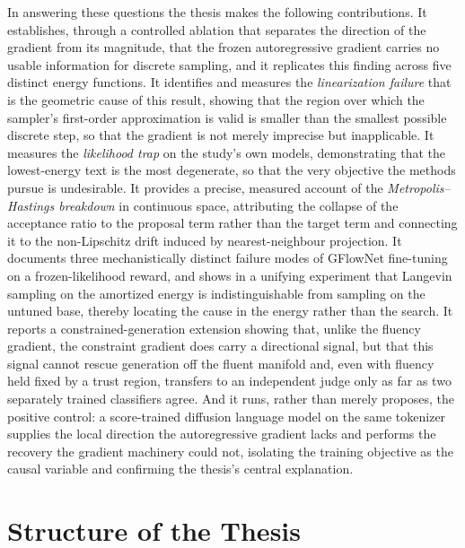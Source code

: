 In answering these questions the thesis makes the following contributions. It establishes, through a controlled ablation that separates the direction of the gradient from its magnitude, that the frozen autoregressive gradient carries no usable information for discrete sampling, and it replicates this finding across five distinct energy functions. It identifies and measures the \emph{linearization failure} that is the geometric cause of this result, showing that the region over which the sampler's first-order approximation is valid is smaller than the smallest possible discrete step, so that the gradient is not merely imprecise but inapplicable. It measures the \emph{likelihood trap} on the study's own models, demonstrating that the lowest-energy text is the most degenerate, so that the very objective the methods pursue is undesirable. It provides a precise, measured account of the \emph{Metropolis--Hastings breakdown} in continuous space, attributing the collapse of the acceptance ratio to the proposal term rather than the target term and connecting it to the non-Lipschitz drift induced by nearest-neighbour projection. It documents three mechanistically distinct failure modes of GFlowNet fine-tuning on a frozen-likelihood reward, and shows in a unifying experiment that Langevin sampling on the amortized energy is indistinguishable from sampling on the untuned base, thereby locating the cause in the energy rather than the search.
It reports a constrained-generation extension showing that, unlike the fluency gradient, the constraint gradient does carry a directional signal, but that this signal cannot rescue generation off the fluent manifold and, even with fluency held fixed by a trust region, transfers to an independent judge only as far as two separately trained classifiers agree. And it runs, rather than merely proposes, the positive control: a score-trained diffusion language model on the same tokenizer supplies the local direction the autoregressive gradient lacks and performs the recovery the gradient machinery could not, isolating the training objective as the causal variable and confirming the thesis's central explanation.

\section{Structure of the Thesis}
\label{sec:intro-structure}

